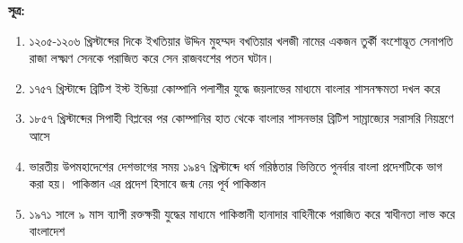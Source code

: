 \vskip 30pt
\scriptsize
\textbf{সূত্র:}
\begin{enumerate}%
	\item ১২০৫-১২০৬ খ্রিস্টাব্দের দিকে ইখতিয়ার উদ্দিন মুহম্মদ বখতিয়ার খলজী নামের একজন তুর্কী বংশোদ্ভূত সেনাপতি রাজা লক্ষ্মণ সেনকে পরাজিত করে সেন রাজবংশের পতন ঘটান।
	\item ১৭৫৭ খ্রিস্টাব্দে ব্রিটিশ ইস্ট ইন্ডিয়া কোম্পানি পলাশীর যুদ্ধে জয়লাভের মাধ্যমে বাংলার শাসনক্ষমতা দখল করে
	\item ১৮৫৭ খ্রিস্টাব্দের সিপাহী বিপ্লবের পর কোম্পানির হাত থেকে বাংলার শাসনভার ব্রিটিশ সাম্রাজ্যের সরাসরি নিয়ন্ত্রণে আসে
	\item ভারতীয় উপমহাদেশের দেশভাগের সময় ১৯৪৭ খ্রিস্টাব্দে ধর্ম গরিষ্ঠতার ভিত্তিতে পুনর্বার বাংলা প্রদেশটিকে ভাগ করা হয়। পাকিস্তান এর প্রদেশ হিসাবে জন্ম নেয় পূর্ব পাকিস্তান 
	\item ১৯৭১ সালে ৯ মাস ব্যাপী রক্তক্ষয়ী যুদ্ধের মাধ্যমে পাকিস্তানী হানাদার বাহিনীকে পরাজিত করে স্বাধীনতা লাভ করে বাংলাদেশ 
\end{enumerate}